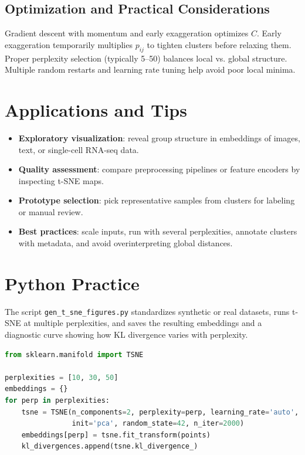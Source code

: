 ﻿\documentclass[12pt]{article}
\begin{document}
\subsection{Optimization and Practical Considerations}
Gradient descent with momentum and early exaggeration optimizes \(C\). Early exaggeration temporarily multiplies \(p_{ij}\) to tighten clusters before relaxing them. Proper perplexity selection (typically 5--50) balances local vs. global structure. Multiple random restarts and learning rate tuning help avoid poor local minima.

\section{Applications and Tips}
\begin{itemize}
  \item \textbf{Exploratory visualization}: reveal group structure in embeddings of images, text, or single-cell RNA-seq data.
  \item \textbf{Quality assessment}: compare preprocessing pipelines or feature encoders by inspecting t-SNE maps.
  \item \textbf{Prototype selection}: pick representative samples from clusters for labeling or manual review.
  \item \textbf{Best practices}: scale inputs, run with several perplexities, annotate clusters with metadata, and avoid overinterpreting global distances.
\end{itemize}

\section{Python Practice}
The script \texttt{gen\_t\_sne\_figures.py} standardizes synthetic or real datasets, runs t-SNE at multiple perplexities, and saves the resulting embeddings and a diagnostic curve showing how KL divergence varies with perplexity.
\begin{lstlisting}[language=Python,caption={Excerpt from gen_t_sne_figures.py}]
from sklearn.manifold import TSNE

perplexities = [10, 30, 50]
embeddings = {}
for perp in perplexities:
    tsne = TSNE(n_components=2, perplexity=perp, learning_rate='auto',
                init='pca', random_state=42, n_iter=2000)
    embeddings[perp] = tsne.fit_transform(points)
    kl_divergences.append(tsne.kl_divergence_)
\end{lstlisting}
\end{document}
